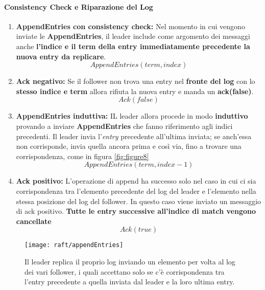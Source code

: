   \paragraph{Consistency Check e Riparazione del Log}
  \begin{enumerate}
    \item{\textbf{AppendEntries con consistency check:}}
    Nel momento in cui vengono inviate le \textbf{AppendEntries}, il leader include come argomento dei messaggi anche \textbf{l'indice e il term della entry immediatamente precedente la nuova entry da replicare}.
    \[
      AppendEntries(term, index)
    \]
    \item{\textbf{Ack negativo:}}
    Se il follower non trova una entry nel \textbf{fronte del log} con lo \textbf{stesso indice e term} allora rifiuta la nuova entry e manda un \textbf{ack(false)}.
    \[
      Ack(false)
    \]
    \item{\textbf{AppendEntries induttiva:}}
    IL leader allora procede in modo \textbf{induttivo} provando a inviare \textbf{AppendEntries} che fanno riferimento agli indici precedenti. Il leader invia l'\textit{entry} precedente all'ultima inviata; se anch'essa non corrisponde, invia quella ancora prima e così via, fino a trovare una corrispondenza, come in figura \ref{fig:figure8}
    \[
      AppendEntries(term, index - 1)
    \]
    \item{\textbf{Ack positivo:}}
    L'operazione di append ha successo solo nel caso in cui ci sia corrispondenza tra l'elemento precedente del log del leader e l'elemento nella stessa posizione del log del follower. In questo caso viene inviato un messaggio di ack positivo. \textbf{Tutte le entry successive all'indice di match vengono cancellate }
    \[
      Ack(true)
    \]
  \end{enumerate}
  
   
  \begin{figure}[H]
  	\centering
  	\texttt{[image: raft/appendEntries]}
  	\caption{Il leader replica il proprio log inviando un elemento per volta al log dei vari follower, i quali accettano solo se c'è corrispondenza tra l'entry precedente a quella inviata dal leader e la loro ultima entry.}
  	\label{fig:figure7}
  \end{figure}

